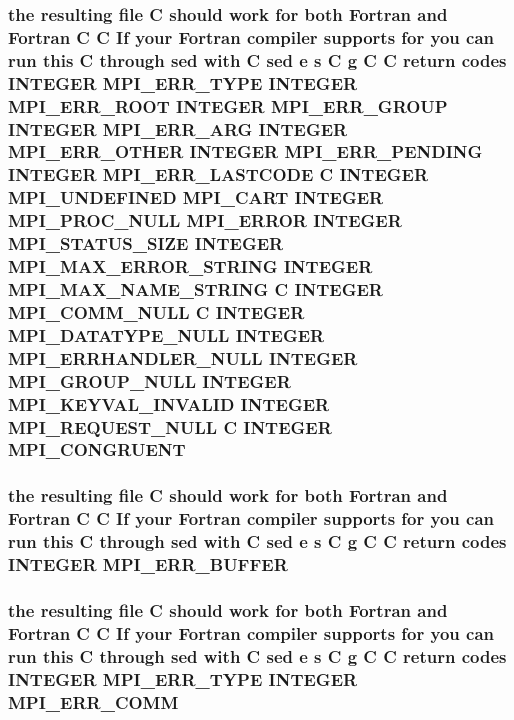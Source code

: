 \subsubsection{\setlength{\rightskip}{0pt plus 5cm}the resulting file C should {\bf work} for both Fortran and Fortran C C If your Fortran compiler supports for you can run this C through sed {\bf with} C sed e s C g C C return codes INTEGER MPI\_\-ERR\_\-TYPE INTEGER MPI\_\-ERR\_\-ROOT INTEGER MPI\_\-ERR\_\-GROUP INTEGER MPI\_\-ERR\_\-ARG INTEGER MPI\_\-ERR\_\-OTHER INTEGER MPI\_\-ERR\_\-PENDING INTEGER MPI\_\-ERR\_\-LASTCODE C INTEGER MPI\_\-UNDEFINED MPI\_\-CART INTEGER MPI\_\-PROC\_\-NULL MPI\_\-ERROR INTEGER MPI\_\-STATUS\_\-SIZE INTEGER MPI\_\-MAX\_\-ERROR\_\-STRING INTEGER MPI\_\-MAX\_\-NAME\_\-STRING C INTEGER MPI\_\-COMM\_\-NULL C INTEGER MPI\_\-DATATYPE\_\-NULL INTEGER MPI\_\-ERRHANDLER\_\-NULL INTEGER MPI\_\-GROUP\_\-NULL INTEGER MPI\_\-KEYVAL\_\-INVALID INTEGER MPI\_\-REQUEST\_\-NULL C INTEGER {\bf MPI\_\-CONGRUENT}}\label{mpif_8h_013c15467340a240f465de76255552b3}


\subsubsection{\setlength{\rightskip}{0pt plus 5cm}the resulting file C should {\bf work} for both Fortran and Fortran C C If your Fortran compiler supports for you can run this C through sed {\bf with} C sed e s C g C C return codes INTEGER {\bf MPI\_\-ERR\_\-BUFFER}}\label{mpif_8h_ee8d8aa5d7b8d51c7bcff6fc0f59200e}


\subsubsection{\setlength{\rightskip}{0pt plus 5cm}the resulting file C should {\bf work} for both Fortran and Fortran C C If your Fortran compiler supports for you can run this C through sed {\bf with} C sed e s C g C C return codes INTEGER MPI\_\-ERR\_\-TYPE INTEGER {\bf MPI\_\-ERR\_\-COMM}}\label{mpif_8h_4a8aa25233054288fe0a2d2cdb23f1b7}


